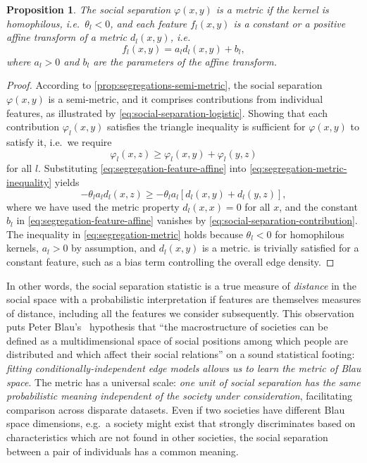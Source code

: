 \documentclass{scrartcl}
\newtheorem{prop}{Proposition}
\begin{document}
\begin{prop}
    The social separation $\varphi(x,y)$ is a metric if the kernel is homophilous, i.e.\ $\theta_l<0$, and each feature $f_l(x, y)$ is a constant or a positive affine transform of a metric $d_l(x, y)$, i.e.
    \begin{equation}
        f_l(x, y) = a_l d_l(x, y) + b_l,\label{eq:segregation-feature-affine}
    \end{equation}
    where $a_l > 0$ and $b_l$ are the parameters of the affine transform.
\end{prop}
\begin{proof}
    According to \cref{prop:segregations-semi-metric}, the social separation $\varphi(x,y)$ is a semi-metric, and it comprises contributions from individual features, as illustrated by \cref{eq:social-separation-logistic}. Showing that each contribution $\varphi_l(x, y)$ satisfies the triangle inequality is sufficient for $\varphi(x, y)$ to satisfy it, i.e.\ we require
    \begin{equation}
        \varphi_l(x, z) \geq \varphi_l(x, y) + \varphi_l(y, z)\label{eq:segregation-metric-inequality}
    \end{equation}
    for all $l$. Substituting \cref{eq:segregation-feature-affine} into \cref{eq:segregation-metric-inequality} yields
    \begin{equation}
        -\theta_l a_l d_l(x, z)\geq -\theta_l a_l\left[d_l(x, y) + d_l(y, z)\right],\label{eq:segregation-metric}
    \end{equation}
    where we have used the metric property $d_l(x, x) = 0$ for all $x$, and the constant $b_l$ in \cref{eq:segregation-feature-affine} vanishes by \cref{eq:social-separation-contribution}. The inequality in \cref{eq:segregation-metric} holds because $\theta_l<0$ for homophilous kernels, $a_l>0$ by assumption, and $d_l(x, y)$ is a metric.  is trivially satisfied for a constant feature, such as a bias term controlling the overall edge density.
\end{proof}

In other words, the social separation statistic is a true measure of \emph{distance} in the social space with a probabilistic interpretation if features are themselves measures of distance, including all the features we consider subsequently. This observation puts Peter Blau's~\cite{Blau1977} hypothesis that ``the macrostructure of societies can be defined as a multidimensional space of social positions among which people are distributed and which affect their social relations'' on a sound statistical footing: \emph{fitting conditionally-independent edge models allows us to learn the metric of Blau space}. The metric has a universal scale: \emph{one unit of social separation has the same probabilistic meaning independent of the society under consideration}, facilitating comparison across disparate datasets. Even if two societies have different Blau space dimensions, e.g.\ a society might exist that strongly discriminates based on characteristics which are not found in other societies, the social separation between a pair of individuals has a common meaning. %
\end{document}
